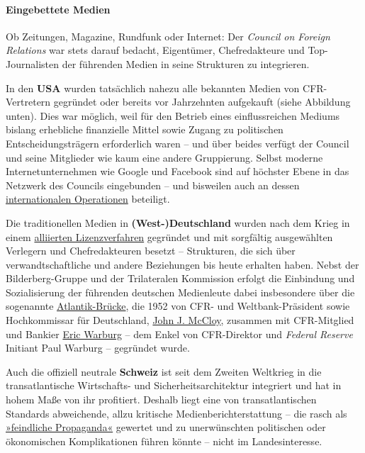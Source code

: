 \hypertarget{eingebettete-medien}{%
\paragraph{Eingebettete Medien}\label{eingebettete-medien}}

Ob Zeitungen, Magazine, Rundfunk oder Internet: Der \emph{Council on
Foreign Relations} war stets darauf bedacht, Eigentümer, Chef­redakteure
und Top-Journalisten der führenden Medien in seine Strukturen zu
integrieren.

In den \textbf{USA} wurden tatsächlich nahezu alle bekannten Medien von
CFR-Vertretern gegründet oder bereits vor Jahrzehnten aufgekauft (siehe
Abbildung unten). Dies war möglich, weil für den Betrieb eines
einflussreichen Mediums bislang erhebliche finanzielle Mittel sowie
Zugang zu politischen Entscheidungsträgern erforderlich waren -- und
über beides verfügt der Council und seine Mitglieder wie kaum eine
andere Gruppierung. Selbst moderne Internet­unternehmen wie Google und
Facebook sind auf höchster Ebene in das Netzwerk des Councils
eingebunden -- und bisweilen auch an dessen
\href{https://www.washingtonexaminer.com/clinton-email-reveals-google-sought-overthrow-of-syrias-assad}{internationalen
Operationen} beteiligt.

Die traditionellen Medien in \textbf{(West-)Deutschland} wurden nach dem
Krieg in einem
\href{https://de.wikipedia.org/wiki/Lizenzzeitung}{alliierten
Lizenzverfahren} gegründet und mit sorgfältig ausgewählten Verlegern und
Chef­redakteuren besetzt -- Strukturen, die sich über
verwandtschaftliche und andere Beziehungen bis heute erhalten haben.
Nebst der Bilderberg-Gruppe und der Trilateralen Kommission erfolgt die
Einbindung und Sozialisierung der führenden deutschen Medienleute dabei
insbesondere über die sogenannte
\href{https://de.wikipedia.org/wiki/Atlantik-Br\%C3\%BCcke}{Atlantik-Brücke},
die 1952 von CFR- und Weltbank-Präsident sowie Hochkommissar für
Deutschland, \href{https://de.wikipedia.org/wiki/John_Jay_McCloy}{John
J. McCloy}, zusammen mit CFR-Mitglied und Bankier
\href{https://de.wikipedia.org/wiki/Eric_M._Warburg}{Eric Warburg} --
dem Enkel von CFR-Direktor und \emph{Federal Reserve} Initiant Paul
Warburg -- gegründet wurde.

Auch die offiziell neutrale \textbf{Schweiz} ist seit dem Zweiten
Weltkrieg in die transatlantische Wirtschafts- und
Sicherheits­architektur integriert und hat in hohem Maße von ihr
profitiert. Deshalb liegt eine von transatlantischen Standards
abweichende, allzu kritische Medien­bericht­erstattung -- die rasch als
\href{https://swprs.org/russische-propaganda/}{»feindliche Propaganda«}
gewertet und zu unerwünschten politischen oder ökonomischen
Komplikationen führen könnte -- nicht im Landesinteresse.

